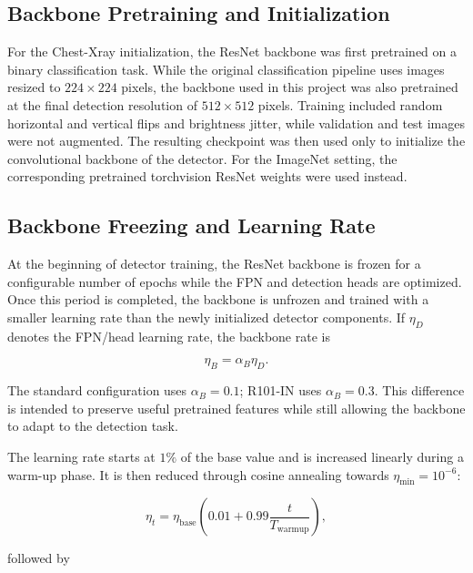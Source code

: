 \documentclass[11pt,a4paper]{article}
\begin{document}
\subsection{Backbone Pretraining and Initialization}
\label{subsec:backbone_pretraining}

For the Chest-Xray initialization, the ResNet backbone was first pretrained on
a binary classification task. While the original classification pipeline uses
images resized to $224\times224$ pixels, the backbone used in this project was
also pretrained at the final detection resolution of $512\times512$ pixels.
Training included random horizontal and vertical flips and brightness jitter,
while validation and test images were not augmented. The resulting checkpoint
was then used only to initialize the convolutional backbone of the detector.
For the ImageNet setting, the corresponding pretrained torchvision ResNet
weights were used instead.

\subsection{Backbone Freezing and Learning Rate}
\label{subsec:backbone_freezing}

At the beginning of detector training, the ResNet backbone is frozen for a configurable number of epochs while the FPN and detection heads are optimized. Once this period is completed, the backbone is unfrozen and trained with a smaller learning rate than the newly initialized detector components. If $\eta_D$ denotes the FPN/head learning rate, the backbone rate is

\begin{equation}
\eta_B=\alpha_B\eta_D.
\end{equation}

The standard configuration uses $\alpha_B=0.1$; R101-IN uses $\alpha_B=0.3$. This difference is intended to preserve useful pretrained features while still allowing the backbone to adapt to the detection task.

The learning rate starts at $1\%$ of the base value and is increased linearly during a warm-up phase. It is then reduced through cosine annealing towards $\eta_{\min}=10^{-6}$:

\begin{equation}
\eta_t=\eta_{\mathrm{base}}\left(0.01+0.99\frac{t}{T_{\mathrm{warmup}}}\right),
\end{equation}

followed by
\end{document}
